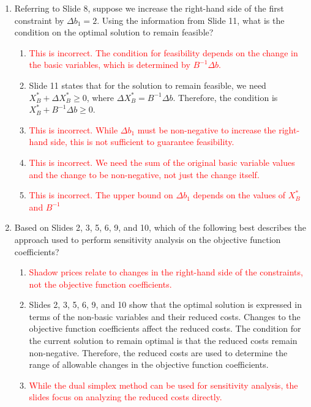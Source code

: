 \documentclass{article}%
\newcommand{\incorrect}[1]{\textcolor{red}{#1}}
\begin{document}
\begin{enumerate}
\begin{enumerate}
\item \incorrect{This is incorrect. The range of $\epsilon$ is more restrictive than this.}%
\end{enumerate}%
\vspace{1em}%
\item Referring to Slide 8, suppose we increase the right-hand side of the first constraint by $\Delta b_1 = 2$. Using the information from Slide 11, what is the condition on the optimal solution to remain feasible?%
\begin{enumerate}%
\item \incorrect{This is incorrect.  The condition for feasibility depends on the change in the basic variables, which is determined by $B^{-1}\Delta b$.}%
\item Slide 11 states that for the solution to remain feasible, we need $X_B^* + \Delta X_B^* \ge 0$, where $\Delta X_B^* = B^{-1}\Delta b$.  Therefore, the condition is $X_B^* + B^{-1}\Delta b \ge 0$.%
\item \incorrect{This is incorrect. While $\Delta b_1$ must be non-negative to increase the right-hand side, this is not sufficient to guarantee feasibility.}%
\item \incorrect{This is incorrect.  We need the sum of the original basic variable values and the change to be non-negative, not just the change itself.}%
\item \incorrect{This is incorrect. The upper bound on $\Delta b_1$ depends on the values of $X_B^*$ and $B^{-1}$}%
\end{enumerate}%
\vspace{1em}%
\item Based on Slides 2, 3, 5, 6, 9, and 10, which of the following best describes the approach used to perform sensitivity analysis on the objective function coefficients?%
\begin{enumerate}%
\item \incorrect{Shadow prices relate to changes in the right-hand side of the constraints, not the objective function coefficients.}%
\item Slides 2, 3, 5, 6, 9, and 10 show that the optimal solution is expressed in terms of the non-basic variables and their reduced costs.  Changes to the objective function coefficients affect the reduced costs. The condition for the current solution to remain optimal is that the reduced costs remain non-negative. Therefore, the reduced costs are used to determine the range of allowable changes in the objective function coefficients.%
\item \incorrect{While the dual simplex method can be used for sensitivity analysis, the slides focus on analyzing the reduced costs directly.}%

\end{enumerate}
\end{enumerate}
\end{document}
